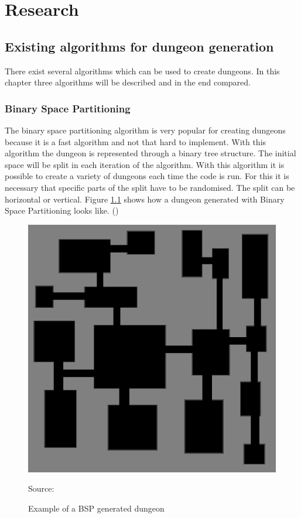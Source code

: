\documentclass[a4paper,11pt,oneside]{scrreprt}
\begin{document}
\chapter{Research}

\section{Existing algorithms for dungeon generation}
There exist several algorithms which can be used to create dungeons. In this chapter three algorithms will be described and in the end compared. 

\subsection{Binary Space Partitioning}
The binary space partitioning algorithm is very popular for creating dungeons because it is a fast algorithm and not that hard to implement. With this algorithm the dungeon is represented through a binary tree structure. The initial space will be split in each iteration of the algorithm. With this algorithm it is possible to create a variety of dungeons each time the code is run. For this it is necessary that specific parts of the split have to be randomised. The split can be horizontal or vertical. Figure \ref{fig:bsp_example} shows how a dungeon generated with Binary Space Partitioning looks like. (\cite[][]{williams_investigation_nodate})

\begin{figure}[htb]
\centering
\includegraphics[scale=0.5]{images/bsp_example.png} 
\caption{Example of a BSP generated dungeon}
Source: \cite[][]{williams_investigation_nodate}
\label{fig:bsp_example}
\end{figure}
\end{document}
